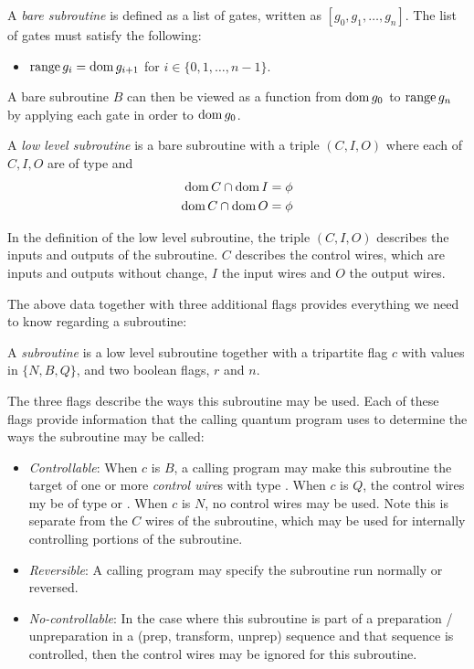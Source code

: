 \begin{definition}\label{def:bare_subroutine}
  A \emph{bare subroutine} is defined as a list of gates, written as
   $[g_0,g_1,\ldots,g_{n}]$. The list of
  gates must satisfy the following:
  \begin{itemize}
    \item $\operatorname*{range}{g_i} = \operatorname*{dom}{g_{i+1}}$ for $i\in\{0,1,\ldots,n-1\}$.
  \end{itemize}
\end{definition}

A bare subroutine $B$ can then be viewed as a function from $\operatorname*{dom}{g_0}$
to $\operatorname*{range}{g_n}$ by
applying each gate in order to $\operatorname*{dom}{g_0}$.

\begin{definition}\label{def:low_level_subroutine}
  A \emph{low level subroutine} is a bare subroutine with a
  triple $(C,I,O)$ where each of $C,I,O$ are of type  and
  \begin{align}
    \operatorname*{dom} C \cap \operatorname*{dom} I &= \phi\\
    \operatorname*{dom} C \cap \operatorname*{dom} O &= \phi
  \end{align}
\end{definition}

In the definition of the low level subroutine, the triple $(C,I,O)$
describes the inputs and outputs of the subroutine. $C$
describes the control wires, which are inputs and outputs without
change, $I$ the input wires and $O$ the output wires.


The above data together with three additional flags provides
everything we need to know regarding a subroutine:
\begin{definition}\label{def:subroutine}
  A \emph{subroutine} is a low level subroutine together with a tripartite
  flag $c$ with values in $\{N,B,Q\}$, and two boolean flags, $r$ and $n$.
\end{definition}
The three flags describe the ways this subroutine may be used. Each of
these flags
provide information that the calling quantum program uses to
determine the ways the subroutine may be called:
\begin{itemize}
  \item \emph{Controllable}: When $c$ is $B$, a calling program may make this
  subroutine the target of one or more \emph{control wire}s with type \bit.
  When $c$ is $Q$, the control wires my be of type \bit or \qubit.
  When $c$ is $N$, no control wires may be used. Note this is separate from
  the $C$ wires of the subroutine, which may be used for internally
  controlling portions of the subroutine.
  \item \emph{Reversible}: A calling program may specify the
  subroutine run normally or reversed.
  \item \emph{No-controllable}: In the case where this subroutine is
  part of a preparation / unpreparation in a (prep, transform, unprep)
  sequence and that sequence is controlled, then the control wires may
  be ignored for this subroutine.
\end{itemize}

